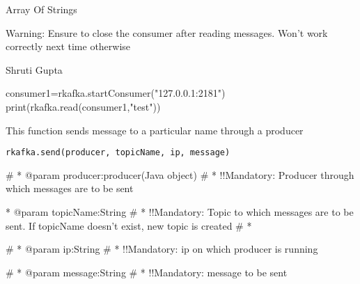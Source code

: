 \documentclass[letterpaper]{book}
\begin{document}
%
\begin{Value}
Array Of Strings
\end{Value}
%
\begin{Note}\relax
Warning: Ensure to close the consumer after reading messages. Won't work correctly next time otherwise
\end{Note}
%
\begin{Author}\relax
Shruti Gupta
\end{Author}
%
\begin{Examples}
\begin{ExampleCode}
consumer1=rkafka.startConsumer("127.0.0.1:2181")
print(rkafka.read(consumer1,"test"))
\end{ExampleCode}
\end{Examples}
%
\begin{Description}\relax
This function sends message to a particular name through a producer
\end{Description}
%
\begin{Usage}
\begin{verbatim}
rkafka.send(producer, topicName, ip, message)
\end{verbatim}
\end{Usage}
%
\begin{Arguments}
\begin{ldescription}
\item[\code{producer}] 
\#     * @param producer:producer(Java object)
\#   *            !!Mandatory: Producer through which messages are to be sent

\item[\code{topicName}] 
* @param topicName:String
\#   *            !!Mandatory: Topic to which messages are to be sent. If topicName doesn't exist, new topic is created
\#   * 

\item[\code{ip}] 
\#     * @param ip:String
\#   *            !!Mandatory: ip on which producer is running

\item[\code{message}] 
\#     * @param message:String
\#   *            !!Mandatory: message to be sent

\end{ldescription}
\end{Arguments}
\end{document}
